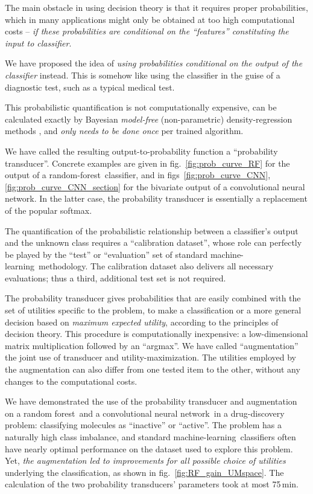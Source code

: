 \documentclass[\ifafour a4paper,12pt,\else a5paper,10pt,\fi%
onecolumn,oneside,article,%
british%
]{memoir}
\theoremstyle{remark}
\theoremstyle{innote}
\renewcommand*{\|}[1][]{\nonscript\:#1\vert\nonscript\:\mathopen{}}
\newcommand*{\fig}{fig.}%
\newcommand*{\figs}{figs}%
\newcommand*{\ml}{machine-learning}
\newcommand*{\RF}{random forest}
\newcommand*{\rf}{random-forest}
\newcommand*{\CNN}{convolutional neural network}
\begin{document}
\medskip

The main obstacle in using decision theory is that it requires proper probabilities, which in many applications might only be obtained at too high computational costs -- \emph{if these probabilities are conditional on the \enquote{features} constituting the input to classifier}.

We have proposed the idea of \emph{using probabilities conditional on the output of the classifier} instead. This is somehow like using the classifier in the guise of a diagnostic test, such as a typical medical test.

This probabilistic quantification is not computationally expensive, can be calculated exactly by Bayesian \emph{model-free} (non-parametric) density-regression methods \autocites{dunsonetal2011}, and \emph{only needs to be done once} per trained algorithm.

We have called the resulting output-to-probability function a \enquote{probability transducer}. Concrete examples are given in \fig~\ref{fig:prob_curve_RF} for the output of a \rf\ classifier, and in \figs~\ref{fig:prob_curve_CNN}, \ref{fig:prob_curve_CNN_section} for the bivariate output of a \CNN. In the latter case, the probability transducer is essentially a replacement of the popular softmax.

The quantification of the probabilistic relationship between a classifier's output and the unknown class requires a \enquote{calibration dataset}, whose role can perfectly be played by the \enquote{test} or \enquote{evaluation} set of standard \ml\ methodology. The calibration dataset also delivers all necessary evaluations; thus a third, additional test set is not required.

The probability transducer gives probabilities that are easily combined with the set of utilities specific to the problem, to make a classification or a more general decision based on \emph{maximum expected utility}, according to the principles of decision theory. This procedure is computationally inexpensive: a low-dimensional matrix multiplication followed by an \enquote{argmax}. We have called \enquote{augmentation} the joint use of transducer and utility-maximization. The utilities employed by the augmentation can also differ from one tested item to the other, without any changes to the computational costs.

We have demonstrated the use of the probability transducer and augmentation on a \RF\ and a \CNN\ in a drug-discovery problem: classifying molecules as \enquote{inactive} or \enquote{active}. The problem has a naturally high class imbalance, and standard \ml\ classifiers often have nearly optimal performance on the dataset used to explore this problem. Yet, \emph{the augmentation led to improvements for all possible choice of utilities} underlying the classification, as shown in \fig~\ref{fig:RF_gain_UMspace}. The calculation of the two probability transducers' parameters took at most 75\,min.
\end{document}
